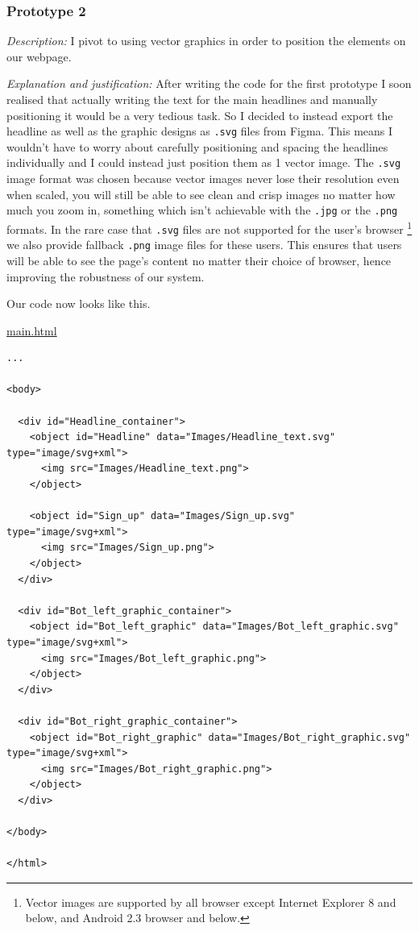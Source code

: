 {\color{gray} \hrulefill} 

\subsubsection{Prototype 2}

\textit{Description:} 
I pivot to using vector graphics in order to position the 
elements on our webpage. \\ \vspace{0.2cm}

\textit{Explanation and justification:}
After writing the code for the first prototype I soon realised
that actually writing the text for the main headlines and 
manually positioning it would be a very tedious task. So I 
decided to instead export the headline as well as the graphic 
designs as \texttt{.svg} files from Figma. This means I
wouldn't have to worry about carefully positioning and spacing
the headlines individually and I could instead just position 
them as 1 vector image. The \texttt{.svg} image format was 
chosen because vector images never lose their resolution even
when scaled, you will still be able to see clean and crisp 
images no matter how much you zoom in, something which isn't
achievable with the \texttt{.jpg} or the \texttt{.png} formats.
In the rare case that \texttt{.svg} files are not supported
for the user's browser \footnote{Vector images are supported
by all browser except Internet Explorer 8 and below, and 
Android 2.3 browser and below.} we also provide fallback 
\texttt{.png} image files for these users. This ensures that 
users will be able to see the page's content no matter their 
choice of browser, hence improving the robustness of our
system.\\ \vspace{0.2cm}

Our code now looks like this.

\underline{main.html}
\begin{verbatim}
...

<body>

  <div id="Headline_container">
    <object id="Headline" data="Images/Headline_text.svg" type="image/svg+xml">
      <img src="Images/Headline_text.png">
    </object>

    <object id="Sign_up" data="Images/Sign_up.svg" type="image/svg+xml">
      <img src="Images/Sign_up.png">
    </object>
  </div>

  <div id="Bot_left_graphic_container">
    <object id="Bot_left_graphic" data="Images/Bot_left_graphic.svg" type="image/svg+xml">
      <img src="Images/Bot_left_graphic.png">
    </object>
  </div>

  <div id="Bot_right_graphic_container">
    <object id="Bot_right_graphic" data="Images/Bot_right_graphic.svg" type="image/svg+xml">
      <img src="Images/Bot_right_graphic.png">
    </object>
  </div>

</body>

</html>
\end{verbatim}

